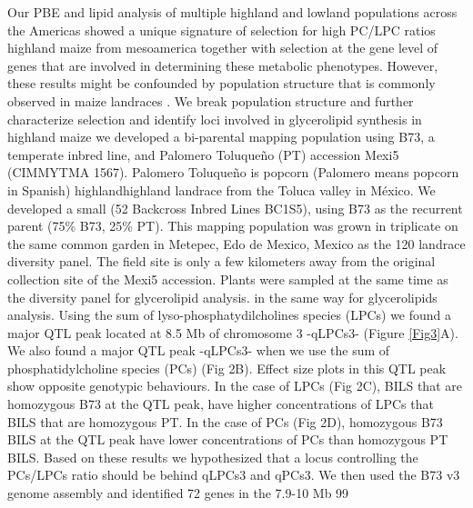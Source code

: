 \documentclass[9pt,twocolumn,twoside,lineno]{gsajnl}
\begin{document}
Our PBE and lipid analysis of multiple highland and lowland populations across the Americas showed a unique signature of selection for high PC/LPC ratios highland maize from mesoamerica together with selection at the gene level of genes that are involved in determining these metabolic phenotypes. 
However, these results might be confounded by population structure that is commonly observed in maize landraces \cite{Romero_Navarro2017-cn}. 
We break population structure and further characterize selection and identify loci involved in glycerolipid synthesis in highland maize we developed a bi-parental mapping population using B73, a temperate inbred line, and Palomero Toluqueño (PT) accession Mexi5 (CIMMYTMA 1567). 
Palomero Toluqueño is popcorn (Palomero means popcorn in Spanish) highlandhighland landrace from the Toluca valley in México. 
We developed a small (52 Backcross Inbred  Lines BC1S5), using B73 as the recurrent parent (75\% B73, 25\% PT). 
This mapping population was grown in triplicate on the same common garden in Metepec, Edo de Mexico, Mexico as the 120 landrace diversity panel. The field site is only a few kilometers away from the original collection site of the Mexi5 accession.  
Plants were sampled at the same time as the diversity panel for glycerolipid analysis. in the same way for glycerolipids analysis. 
Using the sum of lyso-phosphatydilcholines species (LPCs) we found a major QTL peak located at 8.5 Mb of chromosome 3 -qLPCs3- (Figure \ref{Fig3}A). We also found a major QTL peak -qLPCs3- when we use the sum of phosphatidylcholine species (PCs) (Fig 2B). Effect size plots in this QTL peak show opposite genotypic behaviours. In the case of LPCs (Fig 2C), BILS that are homozygous B73 at the QTL peak, have higher concentrations of LPCs that BILS that are homozygous PT. In the case of PCs (Fig 2D), homozygous B73 BILS at the QTL peak have lower concentrations of PCs than homozygous PT BILS. Based on these results we hypothesized that a locus controlling the PCs/LPCs ratio should be behind  qLPCs3 and qPCs3. We then used the B73 v3 genome assembly and identified 72 genes in the 7.9-10 Mb 99%
\end{document}
